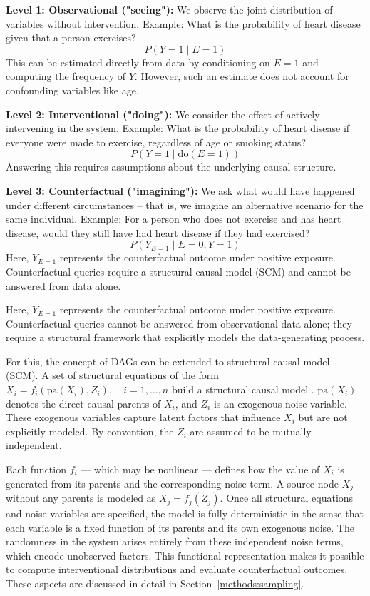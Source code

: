 \textbf{Level 1: Observational ("seeing"):}  
We observe the joint distribution of variables without intervention.  
Example: What is the probability of heart disease given that a person exercises?  
\[
P(Y = 1 \mid E = 1)
\]
This can be estimated directly from data by conditioning on $E = 1$ and computing the frequency of $Y$. However, such an estimate does not account for confounding variables like age.



\textbf{Level 2: Interventional ("doing"):}  
We consider the effect of actively intervening in the system.  
Example: What is the probability of heart disease if everyone were made to exercise, regardless of age or smoking status?  
\[
P(Y = 1 \mid \text{do}(E = 1))
\]
Answering this requires assumptions about the underlying causal structure.



\textbf{Level 3: Counterfactual ("imagining"):}  
We ask what would have happened under different circumstances -- that is, we imagine an alternative scenario for the same individual.  
Example: For a person who does not exercise and has heart disease, would they still have had heart disease if they had exercised?  
\[
P(Y_{E=1} \mid E = 0, Y = 1)
\]
Here, $Y_{E=1}$ represents the counterfactual outcome under positive exposure. Counterfactual queries require a structural causal model (SCM) and cannot be answered from data alone. 

Here, $Y_{E=1}$ represents the counterfactual outcome under positive exposure. Counterfactual queries cannot be answered from observational data alone; they require a structural framework that explicitly models the data-generating process. 





For this, the concept of DAGs can be extended to structural causal model (SCM). A set of structural equations of the form $X_i = f_i(\text{pa}(X_i), Z_i), \quad i = 1, \dots, n$ build a structural causal model \citep{pearl_book2009}.  $\text{pa}(X_i)$ denotes the direct causal parents of $X_i$, and $Z_i$ is an exogenous noise variable. These exogenous variables capture latent factors that influence $X_i$ but are not explicitly modeled. By convention, the $Z_i$ are assumed to be mutually independent.

Each function $f_i$ --- which may be nonlinear --- defines how the value of $X_i$ is generated from its parents and the corresponding noise term. A source node $X_j$ without any parents is modeled as $X_j = f_j(Z_j)$. Once all structural equations and noise variables are specified, the model is fully deterministic in the sense that each variable is a fixed function of its parents and its own exogenous noise. The randomness in the system arises entirely from these independent noise terms, which encode unobserved factors. This functional representation makes it possible to compute interventional distributions and evaluate counterfactual outcomes. These aspects are discussed in detail in Section~\ref{methods:sampling}.


